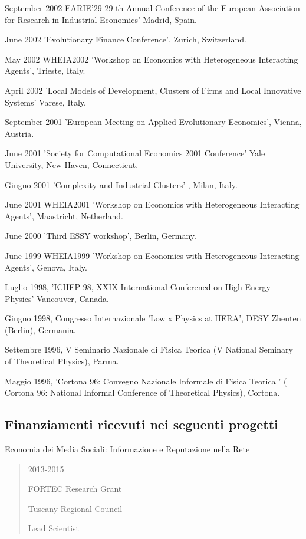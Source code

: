 \documentclass[a4paper]{article}
\newenvironment{DUfieldlist}%
    {\quote\description}
    {\enddescription\endquote}
\begin{document}
September 2002 EARIE'29 29-th Annual Conference of the European
Association for Research in Industrial Economics' Madrid, Spain.

June 2002 'Evolutionary Finance Conference', Zurich, Switzerland.

May 2002 WHEIA2002 'Workshop on Economics with Heterogeneous
Interacting Agents', Trieste, Italy.

April 2002 'Local Models of Development, Clusters of Firms and Local
Innovative Systems' Varese, Italy.

September 2001 'European Meeting on Applied Evolutionary Economics',
Vienna, Austria.

June 2001 'Society for Computational Economics 2001 Conference' Yale
University, New Haven, Connecticut.

Giugno 2001 'Complexity and Industrial Clusters' , Milan, Italy.

June 2001 WHEIA2001 'Workshop on Economics with Heterogeneous
Interacting Agents', Maastricht, Netherland.

June 2000 'Third ESSY workshop', Berlin, Germany.

June 1999 WHEIA1999 'Workshop on Economics with Heterogeneous
Interacting Agents', Genova, Italy.

Luglio 1998, 'ICHEP 98, XXIX International Conferencd on High Energy
Physics' Vancouver, Canada.

Giugno 1998, Congresso Internazionale 'Low x Physics at HERA', DESY
Zheuten (Berlin), Germania.

Settembre 1996, V Seminario Nazionale di Fisica Teorica (V National
Seminary of Theoretical Physics), Parma.

Maggio 1996, 'Cortona 96: Convegno Nazionale Informale di Fisica
Teorica ' ( Cortona 96: National Informal Conference of Theoretical
Physics), Cortona.


\subsection{Finanziamenti ricevuti nei seguenti progetti%
  \label{finanziamenti-ricevuti-nei-seguenti-progetti}%
}

Economia dei Media Sociali: Informazione e Reputazione nella Rete
%
\begin{quote}
%
\begin{DUfieldlist}
\item[{period:}]
2013-2015

\item[{type:}]
FORTEC Research Grant

\item[{sponsor:}]
Tuscany Regional Council

\item[{role:}]
Lead Scientist

\end{DUfieldlist}

\end{quote}
\end{document}
